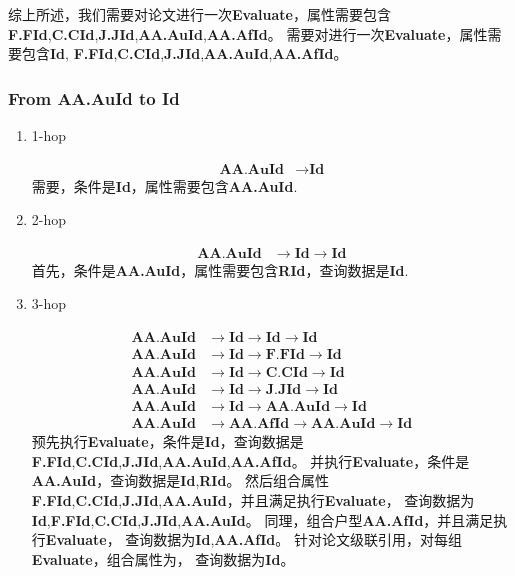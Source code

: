 \documentclass[hyperref,UTF8]{ctexart}
\theoremstyle{definition}
\theoremstyle{remark}
\numberwithin{equation}{subsection}
\newcommand{\Emph}{\textbf}
\newcommand{\Evaluate}{\Emph{Evaluate}}
\newcommand{\Id}{\Emph{Id}}
\newcommand{\RId}{\Emph{RId}}
\newcommand{\FFId}{\Emph{F.FId}}
\newcommand{\CCId}{\Emph{C.CId}}
\newcommand{\JJId}{\Emph{J.JId}}
\newcommand{\AAAuId}{\Emph{AA.AuId}}
\newcommand{\AAAfId}{\Emph{AA.AfId}}
\begin{document}
	综上所述，我们需要对论文进行一次\Evaluate，属性需要包含\FFId,\CCId,\JJId,\AAAuId,\AAAfId。
	需要对进行一次\Evaluate，属性需要包含\Id, \FFId,\CCId,\JJId,\AAAuId,\AAAfId。
	
\subsubsection{From \Emph{AA.AuId} to \Emph{Id}}
\label{subsub:AAAuId2Id}

	\begin{enumerate}[(1)]
		
		\item 1-hop
		
		\begin{align}
			\AAAuId &\rightarrow \Id	
		\end{align}
		需要，条件是\Id，属性需要包含\AAAuId.
		
		\item 2-hop
		
		\begin{align}
			\AAAuId &\rightarrow \Id \rightarrow \Id
		\end{align}
		首先，条件是\AAAuId，属性需要包含\RId，查询数据是\Id.
		
		\item 3-hop
		
		\begin{align}
			\AAAuId &\rightarrow \Id \rightarrow \Id \rightarrow \Id		\\
			\AAAuId &\rightarrow \Id \rightarrow \FFId \rightarrow \Id		\\
			\AAAuId &\rightarrow \Id \rightarrow \CCId \rightarrow \Id		\\
			\AAAuId &\rightarrow \Id \rightarrow \JJId \rightarrow \Id		\\
			\AAAuId &\rightarrow \Id \rightarrow \AAAuId \rightarrow \Id		\\
			\AAAuId &\rightarrow \AAAfId \rightarrow \AAAuId \rightarrow \Id
		\end{align}
		预先执行\Evaluate，条件是\Id，查询数据是\FFId,\CCId,\JJId,\AAAuId,\AAAfId。
		并执行\Evaluate，条件是\AAAuId，查询数据是\Id,\RId。
		然后组合属性\FFId,\CCId,\JJId,\AAAuId，并且满足执行\Evaluate，
		查询数据为\Id,\FFId,\CCId,\JJId,\AAAuId。
		同理，组合户型\AAAfId，并且满足执行\Evaluate，
		查询数据为\Id,\AAAfId。
		针对论文级联引用，对每组\Evaluate，组合属性为，
		查询数据为\Id。
		
	\end{enumerate}
	
\end{document}
